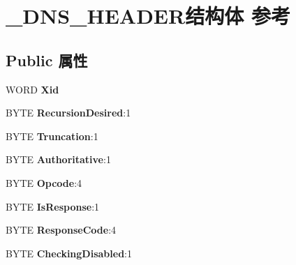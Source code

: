 \hypertarget{struct___d_n_s___h_e_a_d_e_r}{}\section{\+\_\+\+D\+N\+S\+\_\+\+H\+E\+A\+D\+E\+R结构体 参考}
\label{struct___d_n_s___h_e_a_d_e_r}
\subsection*{Public 属性}
\begin{DoxyCompactItemize}
\item 
\mbox{\label{struct___d_n_s___h_e_a_d_e_r_a9401ecea01c361925dafe5e5774fdf6a}} 
W\+O\+RD {\bfseries Xid}
\item 
\mbox{\label{struct___d_n_s___h_e_a_d_e_r_af9a3a17d1439619a9af65a93121d2ba7}} 
B\+Y\+TE {\bfseries Recursion\+Desired}\+:1
\item 
\mbox{\label{struct___d_n_s___h_e_a_d_e_r_aebb49e69360ad622b5e2c5b65393d207}} 
B\+Y\+TE {\bfseries Truncation}\+:1
\item 
\mbox{\label{struct___d_n_s___h_e_a_d_e_r_ae295322379b38ffbbf724b04628ecd11}} 
B\+Y\+TE {\bfseries Authoritative}\+:1
\item 
\mbox{\label{struct___d_n_s___h_e_a_d_e_r_aa6f0b3094209240d71ad68362c5b20f8}} 
B\+Y\+TE {\bfseries Opcode}\+:4
\item 
\mbox{\label{struct___d_n_s___h_e_a_d_e_r_a9ce0b847b9135da10aab776019f675d3}} 
B\+Y\+TE {\bfseries Is\+Response}\+:1
\item 
\mbox{\label{struct___d_n_s___h_e_a_d_e_r_a3de867bae86e3848f54a850b33feb7ef}} 
B\+Y\+TE {\bfseries Response\+Code}\+:4
\item 
\mbox{\label{struct___d_n_s___h_e_a_d_e_r_a8c075ffa74dc26068cf9580327377bdb}} 
B\+Y\+TE {\bfseries Checking\+Disabled}\+:1
\item 

\end{DoxyCompactItemize}

